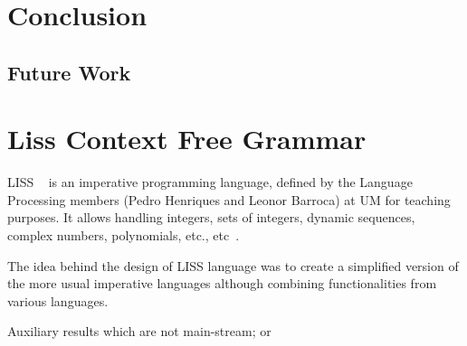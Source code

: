 \documentclass[
  oneside,
  11pt, a4paper,
  footinclude=true,
  headinclude=true,
  cleardoublepage=empty
]{scrbook}
\begin{document}

\chapter{Conclusion}
\section{Future Work}


	

	
	
	
	\chapter{Liss Context Free Grammar}

	LISS ~\citep{CH07a} is an imperative programming language, defined by the Language Processing members (Pedro Henriques and Leonor Barroca) at UM for teaching purposes.
	It allows handling integers, sets of integers, dynamic sequences, complex numbers, polynomials, etc., etc~\citep{CH07d,CH07a,CH06a,CH06b,CH05a}.

	The idea behind the design of LISS language was to create a simplified version of the more usual imperative languages although combining functionalities from various languages.

	
	

	Auxiliary results which are not main-stream; or
\end{document}
